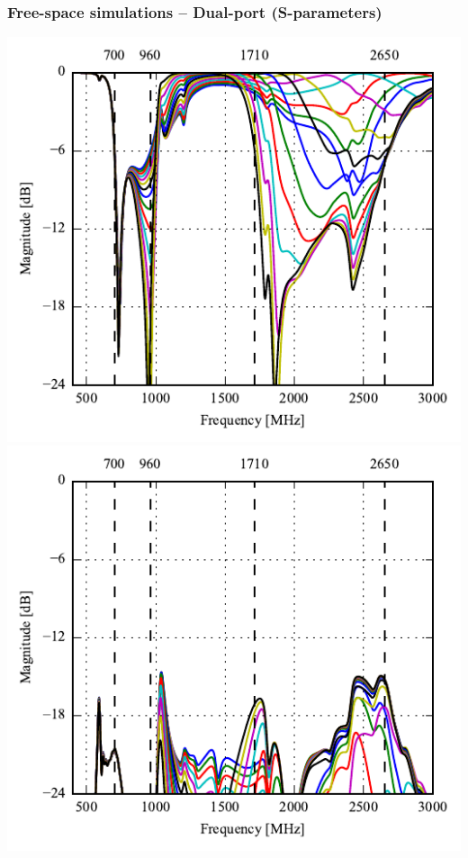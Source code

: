 \begin{frame}
    \frametitle{Free-space simulations -- Dual-port (S-parameters)}

    \vspace*{-0.5cm}
  \begin{minipage}[t]{0.49\linewidth}
    \vspace{0mm}

    \includegraphics[width=0.78\linewidth]{img/henrik/dp/s11_top_sweep.pdf} \\
    \includegraphics[width=0.78\linewidth]{img/henrik/dp/s12_top_sweep.pdf} 

  \end{minipage}\hfill       
  \begin{minipage}[t]{0.49\linewidth}
    \vspace{0 mm}


\end{minipage}
\end{frame}
